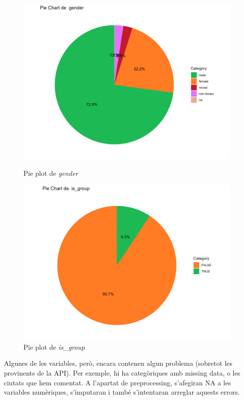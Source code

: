 \begin{figure}[H]
\centering
    \begin{minipage}{.4\textwidth}
        \centering
        \includegraphics[width=0.95\linewidth]{Images/2_Univariate/pie_gender.png}
        \caption{Pie plot de \textit{gender}}
        \label{fig:UnivariateR_gender}
    \end{minipage}%
    \begin{minipage}{.4\textwidth}
        \centering
        \includegraphics[width=0.95\linewidth]{Images/2_Univariate/pie_is_group.png}
        \caption{Pie plot de \textit{is\_group}}
        \label{fig:UnivariateR_group}
    \end{minipage}%
\end{figure}

Algunes de les variables, però, encara contenen algun problema (sobretot les provinents de la API). Per exemple, hi ha categòriques amb missing data, o les ciutats que hem comentat. A l'apartat de preprocessing, s'afegiran NA a les variables numèriques, s'imputaran i també s'intentaran arreglar aquests errors.

